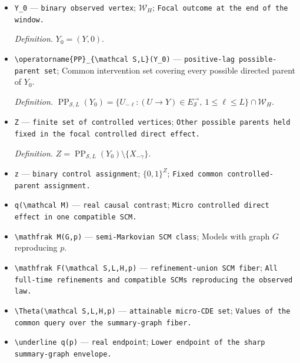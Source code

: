\documentclass{article}
\begin{document}
\begin{itemize}
  \par\smallskip\noindent\emph{Definition.} \(X_{-\gamma}=(X,-\gamma)\).
  \item \texttt{Y\_\allowbreak{}0} --- \texttt{binary observed vertex}; \(\mathcal W_H\); \texttt{Focal outcome at the end of the window.}
  \par\smallskip\noindent\emph{Definition.} \(Y_0=(Y,0)\).
  \item \texttt{\textbackslash{}\allowbreak{}operatorname\{PP\}\allowbreak{}\_\allowbreak{}\{\textbackslash{}\allowbreak{}mathcal S,\allowbreak{}L\}\allowbreak{}(Y\_\allowbreak{}0)} --- \texttt{positive-\allowbreak{}lag possible-\allowbreak{}parent set}; Common intervention set covering every possible directed parent of \(Y_0\).
  \par\smallskip\noindent\emph{Definition.} \(\operatorname{PP}_{\mathcal S,L}(Y_0)=\{U_{-\ell}:(U\to Y)\in E_{\mathcal S}^{\to},\ 1\le\ell\le L\}\cap\mathcal W_H\).
  \item \texttt{Z} --- \texttt{finite set of controlled vertices}; \texttt{Other possible parents held fixed in the focal controlled direct effect.}
  \par\smallskip\noindent\emph{Definition.} \(Z=\operatorname{PP}_{\mathcal S,L}(Y_0)\setminus\{X_{-\gamma}\}\).
  \item \texttt{z} --- \texttt{binary control assignment}; \(\{0,1\}^{Z}\); \texttt{Fixed common controlled-\allowbreak{}parent assignment.}
  \item \texttt{q(\textbackslash{}\allowbreak{}mathcal M)} --- \texttt{real causal contrast}; \texttt{Micro controlled direct effect in one compatible SCM.}
  \item \texttt{\textbackslash{}\allowbreak{}mathfrak M(G,\allowbreak{}p)} --- \texttt{semi-\allowbreak{}Markovian SCM class}; Models with graph \(G\) reproducing \(p\).
  \item \texttt{\textbackslash{}\allowbreak{}mathfrak F(\textbackslash{}\allowbreak{}mathcal S,\allowbreak{}L,\allowbreak{}H,\allowbreak{}p)} --- \texttt{refinement-\allowbreak{}union SCM fiber}; \texttt{All full-\allowbreak{}time refinements and compatible SCMs reproducing the observed law.}
  \item \texttt{\textbackslash{}\allowbreak{}Theta(\textbackslash{}\allowbreak{}mathcal S,\allowbreak{}L,\allowbreak{}H,\allowbreak{}p)} --- \texttt{attainable micro-\allowbreak{}CDE set}; \texttt{Values of the common query over the summary-\allowbreak{}graph fiber.}
  \item \texttt{\textbackslash{}\allowbreak{}underline q(p)} --- \texttt{real endpoint}; \texttt{Lower endpoint of the sharp summary-\allowbreak{}graph envelope.}

\end{itemize}
\end{document}
